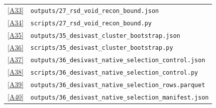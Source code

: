 \documentclass[aps,prd,twocolumn,superscriptaddress,showpacs,preprintnumbers,nofootinbib,longbibliography,floatfix]{revtex4-2}
\newcommand{\repoBase}{https://github.com/Hubify-Projects/bigbounce/blob/main}
\begin{document}
\begin{table}[p]
{\begin{ruledtabular}
\begin{tabular}{lp{}}
\href{\repoBase/pipelines/p5\_desi\_chirality/outputs/27\_rsd\_void\_recon\_bound.json}{[A33]} & \texttt{outputs/27\_rsd\_void\_recon\_bound.json} \\
\href{\repoBase/pipelines/p5\_desi\_chirality/scripts/27\_rsd\_void\_recon\_bound.py}{[A34]} & \texttt{scripts/27\_rsd\_void\_recon\_bound.py} \\
\href{\repoBase/pipelines/p5\_desi\_chirality/outputs/35\_desivast\_cluster\_bootstrap.json}{[A35]} & \texttt{outputs/35\_desivast\_cluster\_bootstrap.json} \\
\href{\repoBase/pipelines/p5\_desi\_chirality/scripts/35\_desivast\_cluster\_bootstrap.py}{[A36]} & \texttt{scripts/35\_desivast\_cluster\_bootstrap.py} \\
\href{\repoBase/pipelines/p5\_desi\_chirality/outputs/36\_desivast\_native\_selection\_control.json}{[A37]} & \texttt{outputs/36\_desivast\_native\_selection\_control.json} \\
\href{\repoBase/pipelines/p5\_desi\_chirality/scripts/36\_desivast\_native\_selection\_control.py}{[A38]} & \texttt{scripts/36\_desivast\_native\_selection\_control.py} \\
\href{\repoBase/pipelines/p5\_desi\_chirality/outputs/36\_desivast\_native\_selection\_rows.parquet}{[A39]} & \texttt{outputs/36\_desivast\_native\_selection\_rows.parquet} \\
\href{\repoBase/pipelines/p5\_desi\_chirality/outputs/36\_desivast\_native\_selection\_manifest.json}{[A40]} & \texttt{outputs/36\_desivast\_native\_selection\_manifest.json} \\
\end{tabular}
\end{ruledtabular}
}%
\end{table}
\clearpage
\end{document}
